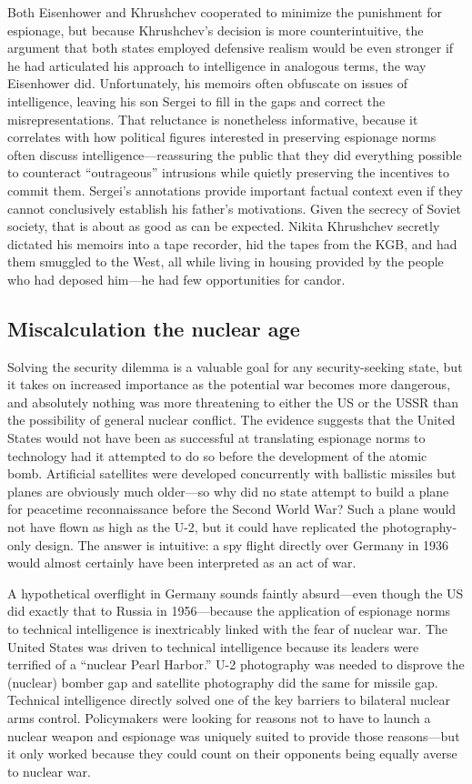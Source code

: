 \documentclass[11pt]{memoir}
\begin{document}
Both Eisenhower and Khrushchev cooperated to minimize the punishment for espionage, but because Khrushchev's decision is more counterintuitive, the argument that both states employed defensive realism would be even stronger if he had articulated his approach to intelligence in analogous terms, the way Eisenhower did. Unfortunately, his memoirs often obfuscate on issues of intelligence, leaving his son Sergei to fill in the gaps and correct the misrepresentations. That reluctance is nonetheless informative, because it correlates with how political figures interested in preserving espionage norms often discuss intelligence---reassuring the public that they did everything possible to counteract ``outrageous'' intrusions while quietly preserving the incentives to commit them. Sergei's annotations provide important factual context even if they cannot conclusively establish his father's motivations. Given the secrecy of Soviet society, that is about as good as can be expected. Nikita Khrushchev secretly dictated his memoirs into a tape recorder, hid the tapes from the KGB, and had them smuggled to the West, all while living in housing provided by the people who had deposed him---he had few opportunities for candor.

\subsection{Miscalculation the nuclear age}
Solving the security dilemma is a valuable goal for any security-seeking state, but it takes on increased importance as the potential war becomes more dangerous, and absolutely nothing was more threatening to either the US or the USSR than the possibility of general nuclear conflict. The evidence suggests that the United States would not have been as successful at translating espionage norms to technology had it attempted to do so before the development of the atomic bomb. Artificial satellites were developed concurrently with ballistic missiles but planes are obviously much older---so why did no state attempt to build a plane for peacetime reconnaissance before the Second World War? Such a plane would not have flown as high as the U-2, but it could have replicated the photography-only design. The answer is intuitive: a spy flight directly over Germany in 1936 would almost certainly have been interpreted as an act of war.

A hypothetical overflight in Germany sounds faintly absurd---even though the US did exactly that to Russia in 1956---because the application of espionage norms to technical intelligence is inextricably linked with the fear of nuclear war. The United States was driven to technical intelligence because its leaders were terrified of a ``nuclear Pearl Harbor.'' U-2 photography was needed to disprove the (nuclear) bomber gap and satellite photography did the same for missile gap. Technical intelligence directly solved one of the key barriers to bilateral nuclear arms control. Policymakers were looking for reasons not to have to launch a nuclear weapon and espionage was uniquely suited to provide those reasons---but it only worked because they could count on their opponents being equally averse to nuclear war.
\end{document}
